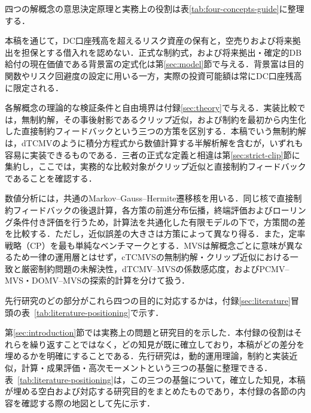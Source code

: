 \documentclass[10pt,a4paper]{article}
\theoremstyle{plain}
\theoremstyle{definition}
\begin{document}
四つの解概念の意思決定原理と実務上の役割は表\ref{tab:four-concepts-guide}に整理する．

本稿を通じて，DC口座残高を超えるリスク資産の保有と，空売りおよび将来拠出を担保とする借入れを認めない．正式な制約式，および将来拠出・確定的DB給付の現在価値である背景富の定式化は第\ref{sec:model}節で与える．背景富は目的関数やリスク回避度の設定に用いる一方，実際の投資可能額は常にDC口座残高に限定される．

各解概念の理論的な検証条件と自由境界は付録\ref{sec:theory}で与える．実装比較では，無制約解，その事後射影であるクリップ近似，および制約を最初から内生化した直接制約フィードバックという三つの方策を区別する．本稿でいう無制約解は，dTCMVのように積分方程式から数値計算する半解析解を含むが，いずれも容易に実装できるものである．三者の正式な定義と相違は第\ref{sec:strict-clip}節に集約し，ここでは，実務的な比較対象がクリップ近似と直接制約フィードバックであることを確認する．

数値分析には，共通のMarkov--Gauss--Hermite遷移核を用いる．同じ核で直接制約フィードバックの後退計算，各方策の前進分布伝播，終端評価およびローリング条件付き評価を行うため，計算法を共通化した有限モデルの下で，方策間の差を比較する．ただし，近似誤差の大きさは方策によって異なり得る．また，定率戦略（CP）を最も単純なベンチマークとする．MVSは解概念ごとに意味が異なるため一律の運用層とはせず，cTCMVSの無制約解・クリップ近似における一致と厳密制約問題の未解決性，dTCMV--MVSの係数感応度，およびPCMV--MVS・DOMV--MVSの探索的計算を分けて扱う．

先行研究のどの部分がこれら四つの目的に対応するかは，付録\ref{sec:literature}冒頭の表~\ref{tab:literature-positioning}で示す．



第\ref{sec:introduction}節では実務上の問題と研究目的を示した．本付録の役割はそれらを繰り返すことではなく，どの知見が既に確立しており，本稿がどの差分を埋めるかを明確にすることである．先行研究は，動的運用理論，制約と実装近似，計算・成果評価・高次モーメントという三つの基盤に整理できる．表~\ref{tab:literature-positioning}は，この三つの基盤について，確立した知見，本稿が埋める空白および対応する研究目的をまとめたものであり，本付録の各節の内容を確認する際の地図として先に示す．
\end{document}
